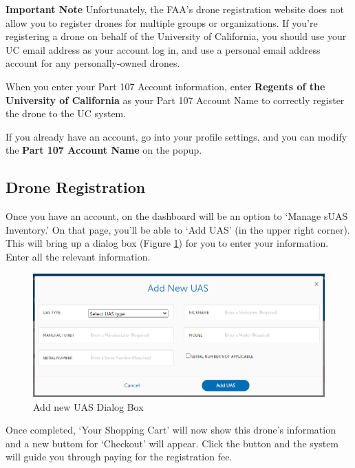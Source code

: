 \documentclass[
  12pt,
]{book}
\newenvironment{notebox}{
  \definecolor{shadecolor}{gray}{.8}  %
  \color{black}
  \begin{shaded}}
 {\end{shaded}}
\begin{document}
\textbf{Important Note} Unfortunately, the FAA's drone registration website does not allow you to register drones for multiple groups or organizations. If you're registering a drone on behalf of the University of California, you should use your UC email address as your account log in, and use a personal email address account for any personally-owned drones.

When you enter your Part 107 Account information, enter \textbf{Regents of the University of California} as your Part 107 Account Name to correctly register the drone to the UC system.

\begin{notebox}
If you already have an account, go into your profile settings, and you can modify the \textbf{Part 107 Account Name} on the popup.

\end{notebox}

\subsection{Drone Registration}\label{drone-registration}

Once you have an account, on the dashboard will be an option to `Manage sUAS Inventory.' On that page, you'll be able to `Add UAS' (in the upper right corner). This will bring up a dialog box (Figure \ref{fig:add-UAS}) for you to enter your information. Enter all the relevant information.

\begin{figure}

{\centering \includegraphics[width=0.8\linewidth]{images/Add_new_UAS} 

}

\caption{Add new UAS Dialog Box}\label{fig:add-UAS}
\end{figure}

Once completed, `Your Shopping Cart' will now show this drone's information and a new buttom for `Checkout' will appear. Click the button and the system will guide you through paying for the registration fee.
\end{document}
